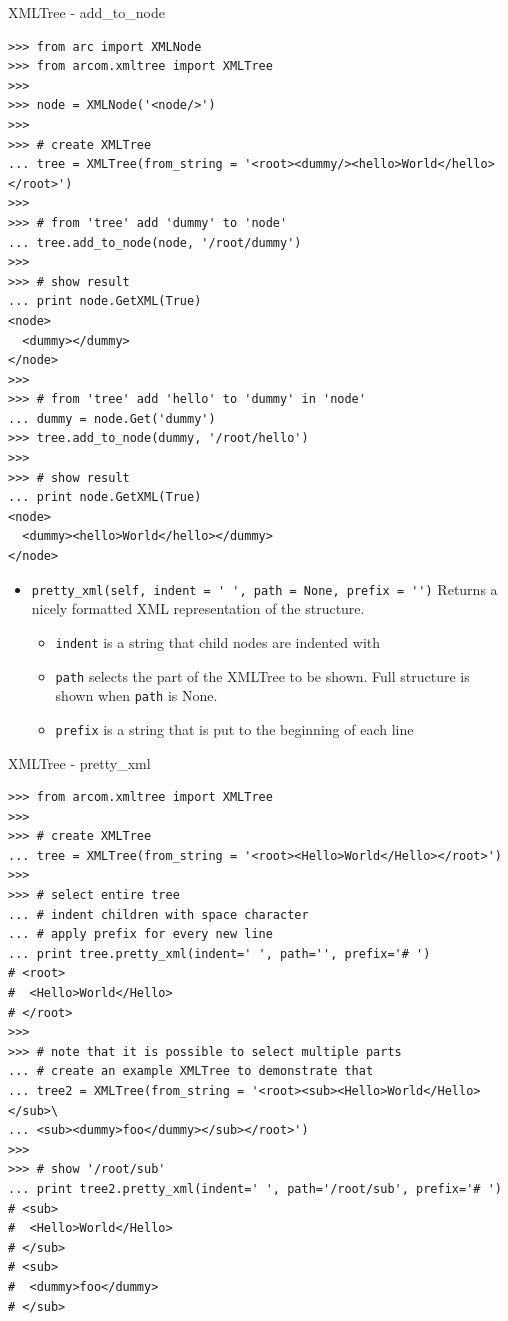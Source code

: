 \documentclass{article}
\begin{document}
\begin{flushleft}
\begin{itemize}
{    \begin{example}
      \caption{XMLTree - add\_to\_node}\label{xtadd2n}
\begin{verbatim}
>>> from arc import XMLNode
>>> from arcom.xmltree import XMLTree
>>> 
>>> node = XMLNode('<node/>')
>>> 
>>> # create XMLTree
... tree = XMLTree(from_string = '<root><dummy/><hello>World</hello></root>')
>>> 
>>> # from 'tree' add 'dummy' to 'node'
... tree.add_to_node(node, '/root/dummy')
>>> 
>>> # show result
... print node.GetXML(True)
<node>
  <dummy></dummy>
</node>
>>> 
>>> # from 'tree' add 'hello' to 'dummy' in 'node'
... dummy = node.Get('dummy')
>>> tree.add_to_node(dummy, '/root/hello')
>>> 
>>> # show result
... print node.GetXML(True)
<node>
  <dummy><hello>World</hello></dummy>
</node>
\end{verbatim}
    \end{example}

    \begin{itemize}
      \item{ \verb$pretty_xml(self, indent = ' ', path = None, prefix = '')$ \linebreak
      Returns a nicely formatted XML representation of the structure.
        \begin{itemize}
          \item{\verb$indent$ is a string that child nodes are indented with}
          \item{\verb$path$ selects the part of the XMLTree to be shown. Full structure is shown when \verb$path$ is None.}
          \item{\verb$prefix$ is a string that is put to the beginning of each line}
        \end{itemize}
      }
    \end{itemize}

    \begin{example}
      \caption{XMLTree - pretty\_xml}\label{xtpretty}
\begin{verbatim}
>>> from arcom.xmltree import XMLTree
>>> 
>>> # create XMLTree
... tree = XMLTree(from_string = '<root><Hello>World</Hello></root>')
>>> 
>>> # select entire tree
... # indent children with space character
... # apply prefix for every new line
... print tree.pretty_xml(indent=' ', path='', prefix='# ')
# <root>
#  <Hello>World</Hello>
# </root>
>>> 
>>> # note that it is possible to select multiple parts
... # create an example XMLTree to demonstrate that
... tree2 = XMLTree(from_string = '<root><sub><Hello>World</Hello></sub>\
... <sub><dummy>foo</dummy></sub></root>')
>>> 
>>> # show '/root/sub'
... print tree2.pretty_xml(indent=' ', path='/root/sub', prefix='# ')
# <sub>
#  <Hello>World</Hello>
# </sub>
# <sub>
#  <dummy>foo</dummy>
# </sub>
\end{verbatim}
    \end{example}

}
\end{itemize}
\end{flushleft}
\end{document}
